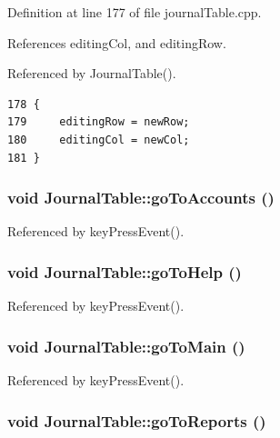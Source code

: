 Definition at line 177 of file journal\-Table.cpp.

References editing\-Col, and editing\-Row.

Referenced by Journal\-Table().

\footnotesize\begin{verbatim}178 {
179     editingRow = newRow;
180     editingCol = newCol;
181 }
\end{verbatim}\normalsize 


\hypertarget{classJournalTable_l1}{
\subsubsection[goToAccounts]{\setlength{\rightskip}{0pt plus 5cm}void Journal\-Table::go\-To\-Accounts ()}}
\label{classJournalTable_l1}




Referenced by key\-Press\-Event().\hypertarget{classJournalTable_l3}{
\subsubsection[goToHelp]{\setlength{\rightskip}{0pt plus 5cm}void Journal\-Table::go\-To\-Help ()}}
\label{classJournalTable_l3}




Referenced by key\-Press\-Event().\hypertarget{classJournalTable_l0}{
\subsubsection[goToMain]{\setlength{\rightskip}{0pt plus 5cm}void Journal\-Table::go\-To\-Main ()}}
\label{classJournalTable_l0}




Referenced by key\-Press\-Event().\hypertarget{classJournalTable_l2}{
\subsubsection[goToReports]{\setlength{\rightskip}{0pt plus 5cm}void Journal\-Table::go\-To\-Reports ()}}
\label{classJournalTable_l2}




